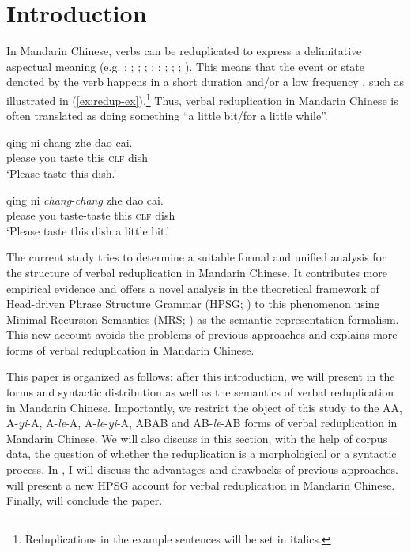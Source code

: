 \section{Introduction}\label{sec:intro}

In Mandarin Chinese, verbs can be reduplicated to express a delimitative aspectual meaning (e.g. \citealt[204--205]{Chao1968}; \citealt[232]{LiThompson1981};  \citealt[14]{Li1996}; \citealt[70]{Dai1997};  \citealt[382--383]{Zhu1998}; \citealt[420--421]{Xing2000}; \citealt[48]{Chen2001};  \citealt[288]{Tsao2001}; \citealt[11--12]{Yang2003}; \citealt[Sec. 4.3]{XiaoMcEnery2004}). 
This means that the event or state denoted by the verb happens in a short duration and/or a low frequency \citep[155]{XiaoMcEnery2004}, such as illustrated in (\ref{ex:redup-ex}).\footnote{Reduplications
    in the example sentences will be set in italics.}
Thus, verbal reduplication in Mandarin Chinese is often translated as doing something ``a little bit/for a little while”.

\ea\label{ex:redup-ex} 
	\ea
	\gll qing ni chang zhe dao cai.\\
	please you taste this \textsc{clf} dish\\
	\glt `Please taste this dish.'
	
	\ex
	\gll qing ni \textit{chang}-\textit{chang} zhe dao cai.\\
	please you taste-taste this \textsc{clf} dish\\
	\glt `Please taste this dish a little bit.' 
	\z
\z

The current study tries to determine a suitable formal and unified analysis for the structure of verbal reduplication in Mandarin Chinese.
It contributes more empirical evidence and 
offers a novel analysis in the theoretical framework of Head-driven Phrase Structure Grammar (HPSG; \citealt{PollardSag1994, Sag1997, Mueller2013}) to this phenomenon 
using Minimal Recursion Semantics (MRS; \citealt{Copestakeetal2005}) as the semantic representation formalism.
This new account avoids the problems of previous approaches and
explains more forms of verbal reduplication in Mandarin Chinese.

This paper is organized as follows: 
after this introduction, we will present in  the forms and syntactic distribution as well as the semantics of verbal reduplication in Mandarin Chinese. 
Importantly, we restrict the object of this study to the AA, A-\textit{yi}-A, A-\textit{le}-A, A-\textit{le}-\textit{yi}-A, ABAB and AB-\textit{le}-AB forms of verbal reduplication in Mandarin Chinese.
We will also discuss in this section, with the help of corpus data, the question of whether the reduplication is a morphological or a syntactic process.
In , I will discuss the advantages and drawbacks of previous approaches. 
 will present a new {HPSG} account for verbal reduplication in Mandarin Chinese.
Finally,   will conclude the paper.

